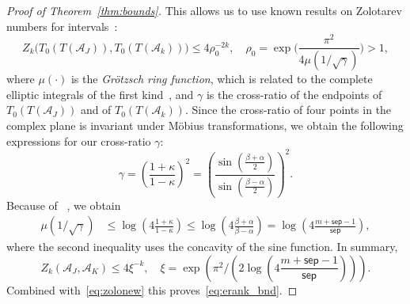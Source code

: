 \documentclass[final,reqno,onefignum,onetabnum]{siamart190516}
\newcommand{\sep}{\mathsf{sep}}
\begin{document}
\begin{proof}[Proof of Theorem~\ref{thm:bounds}]
This allows us to use known results on Zolotarev numbers for intervals~\cite[Cor. 4.2]{Beckermann2019}: 
\begin{equation*} \label{eq:zolo_bnd}
Z_k\big(T_0(T(\mathcal A_J)),T_0(T(\mathcal A_k))\big) \leq 4 \rho_0^{-2k}, \quad \rho_0 = \exp\Big( \frac{\pi^2}{4 \mu (1/\sqrt{\gamma})}\Big) > 1 , 
\end{equation*}
where $\mu(\cdot)$ is the \textit{Gr\"otzsch ring function}, which is related to the complete elliptic integrals of the first kind~\cite[Sec.~3]{Beckermann2019},
and $\gamma$ is the cross-ratio of the endpoints of $T_0(T(\mathcal A_J))$ and of $T_0(T(\mathcal A_k))$. Since the cross-ratio of four points in the complex plane is invariant under M\"obius transformations, we obtain the following expressions for our cross-ratio $\gamma$:
\begin{equation} 
\label{eq:cr_arcsnew}
\gamma 
= \left(\frac{1+\kappa}{1-\kappa} \right)^2
= \left( \frac{ \sin \left( \tfrac{\beta + \alpha}{2} \right)}{\sin \left( \tfrac{\beta - \alpha}{2} \right)} \right)^2.
\end{equation}
Because of ~\cite[19.9.5]{olver2010nist}, we obtain
 \begin{align} \label{eq:auxinequality}
\mu(1 / \sqrt{ \gamma} ) & 
\leq \log\left( 4 \frac{1+\kappa}{1-\kappa} \right) \le \log \left( 4 \frac{ \beta + \alpha}{\beta - \alpha} \right)=
\log \left( 4 \frac{ m+\sep-1}{\sep} \right),
 \end{align}
where the second inequality uses the concavity of the sine function.
 In summary,
 \begin{equation}
\label{eq:bound_zolo_arcs}
 Z_k(\mathcal{A}_J, \mathcal{A}_K)  \leq 4 \xi^{-k}, \quad \xi = \exp \left(  \pi^2 / \left( 2 \log \left( 4 \frac{ m+\sep-1}{\sep} \right)  \right) \right). 
\end{equation}
 Combined with~\eqref{eq:zolonew} this proves~\eqref{eq:erank_bnd}. 
\end{proof}
\end{document}
